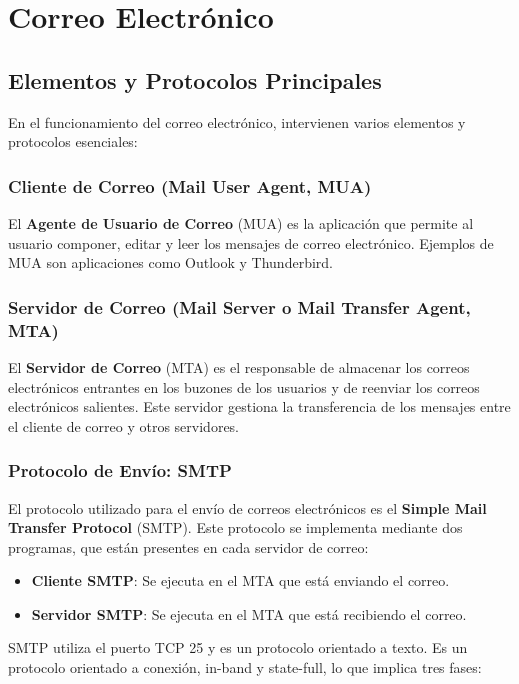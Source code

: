 \documentclass[a4paper,12pt]{article}
\begin{document}
\section{Correo Electrónico}


\subsection{Elementos y Protocolos Principales}

En el funcionamiento del correo electrónico, intervienen varios elementos y protocolos esenciales:

\subsubsection{Cliente de Correo (Mail User Agent, MUA)}
El \textbf{Agente de Usuario de Correo} (MUA) es la aplicación que permite al usuario componer, editar y leer los mensajes de correo electrónico. Ejemplos de MUA son aplicaciones como Outlook y Thunderbird.

\subsubsection{Servidor de Correo (Mail Server o Mail Transfer Agent, MTA)}
El \textbf{Servidor de Correo} (MTA) es el responsable de almacenar los correos electrónicos entrantes en los buzones de los usuarios y de reenviar los correos electrónicos salientes. Este servidor gestiona la transferencia de los mensajes entre el cliente de correo y otros servidores.

\subsubsection{Protocolo de Envío: SMTP}
El protocolo utilizado para el envío de correos electrónicos es el \textbf{Simple Mail Transfer Protocol} (SMTP). Este protocolo se implementa mediante dos programas, que están presentes en cada servidor de correo:

\begin{itemize}
    \item \textbf{Cliente SMTP}: Se ejecuta en el MTA que está enviando el correo.
    \item \textbf{Servidor SMTP}: Se ejecuta en el MTA que está recibiendo el correo.
\end{itemize}

SMTP utiliza el puerto TCP 25 y es un protocolo orientado a texto. Es un protocolo orientado a conexión, in-band y state-full, lo que implica tres fases:
\end{document}
